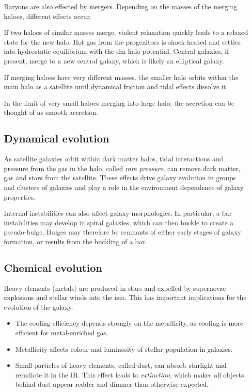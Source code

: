 Baryons are also effected by mergers. Depending on the masses of the merging haloes, different effects occur.

If two haloes of similar masses merge, violent relaxation quickly leads to a relaxed state for the new halo.
Hot gas from the progenitors is shock-heated and settles into hydrostatic equilibrium with the \ac{dm} halo potential.
Central galaxies, if present, merge to a new central galaxy, which is likely an elliptical galaxy.

If merging haloes have very different masses, the smaller halo orbits within the main halo as a satellite until dynamical friction and tidal effects dissolve it.

In the limit of very small haloes merging into large halo, the accretion can be thought of as smooth accretion.


\subsection{Dynamical evolution}

As satellite galaxies orbit within dark matter halos, tidal interactions and pressure from the gas in the halo, called \emph{ram pressure}, can remove dark matter, gas and stars from the satellite.
These effects drive galaxy evolution in groups and clusters of galaxies and play a role in the environment dependence of galaxy properties.

Internal instabilities can also affect galaxy morphologies. 
In particular, a bar instabilities may develop in spiral galaxies, which can then buckle to create a pseudo-bulge. 
Bulges may therefore be remnants of either early stages of galaxy formation, or results from the buckling of a bar.

\subsection{Chemical evolution}

Heavy elements (metals) are produced in stars and expelled by supernovae explosions and stellar winds into the \ac{ism}. This has important implications for the evolution of the galaxy:

\begin{itemize}
	\item The cooling efficiency depends strongly on the metallicity, as cooling is more efficient for metal-enriched gas.
	\item Metallicity affects colour and luminosity of stellar population in galaxies.
	\item Small particles of heavy elements, called dust, can absorb starlight and reradiate it in the IR.
	This effect leads to \emph{extinction}, which makes all objects behind dust appear redder and dimmer than otherwise expected.
\end{itemize}


